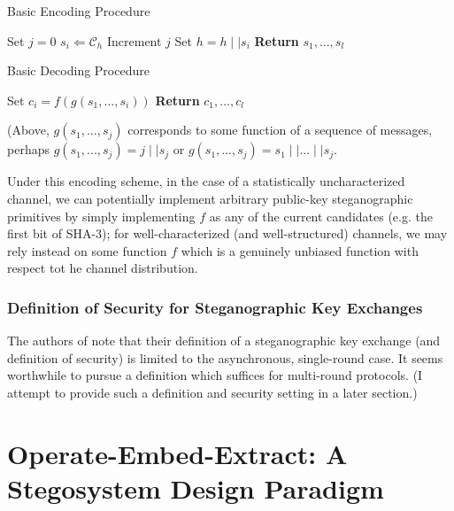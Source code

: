 \documentclass{article}
\begin{document}
\begin{algorithm}[H]
\caption{Basic Encoding Procedure}\label{1a}
\begin{algorithmic}[1]
\State Set $j = 0$
\State $s_i \Leftarrow \mathcal{C}_h$
\State Increment $j$
\EndWhile
\State Set $h = h \mid \mid s_i$
\EndFor
\State \textbf{Return} $s_1,...,s_l$
\EndProcedure
\end{algorithmic}
\end{algorithm}

\begin{algorithm}[H]
\caption{Basic Decoding Procedure}\label{1a}
\begin{algorithmic}[1]
\State Set $c_i = f(g(s_1,...,s_i))$
\EndFor
\State \textbf{Return} $c_1,...,c_l$
\EndProcedure
\end{algorithmic}
\end{algorithm}

\noindent (Above, $g(s_1,...,s_j)$ corresponds to some function of a sequence of messages, perhaps $g(s_1,...,s_j) = j \mid \mid s_j$ or 
$g(s_1,...,s_j) = s_1 \mid \mid ... \mid \mid s_j$.

Under this encoding scheme, in the case of a statistically uncharacterized channel, we can potentially implement arbitrary 
public-key steganographic primitives by simply implementing $f$ as any of the current candidates (e.g. the first bit of SHA-3); for well-characterized 
(and well-structured) channels, we may rely instead on some function $f$ which is a genuinely unbiased function with respect tot he channel 
distribution.

\subsubsection{Definition of Security for Steganographic Key Exchanges}

The authors of \cite{BiglouPubKey} note that their definition of a steganographic key exchange (and definition of security) is limited to the 
asynchronous, single-round case.  It seems worthwhile to pursue a definition which suffices for multi-round protocols.  (I attempt to provide such a 
definition and security setting in a later section.)

\section{Operate-Embed-Extract: A Stegosystem Design Paradigm}
\end{document}
